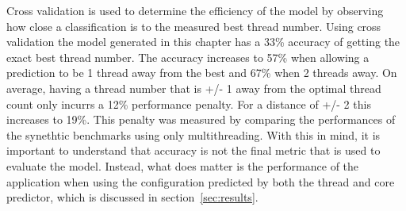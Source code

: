 Cross validation is used to determine the efficiency of the model by observing how close a classification is to the measured best thread number.
Using cross validation the model generated in this chapter has a 33\% accuracy of getting the exact best thread number.
The accuracy increases to 57\% when allowing a prediction to be 1 thread away from the best and 67\% when 2 threads away.
On average, having a thread number that is +/- 1 away from the optimal thread count only incurrs a 12\% performance penalty.
For a distance of +/- 2 this increases to 19\%.
This penalty was measured by comparing the performances of the synethtic benchmarks using only multithreading.
With this in mind, it is important to understand that accuracy is not the final metric that is used to evaluate the model.
Instead, what does matter is the performance of the application when using the configuration predicted by both the thread and core predictor, which is discussed in section~\ref{sec:results}.

